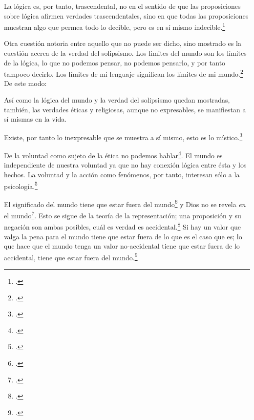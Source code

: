         La lógica es, por tanto, trascendental, no en el sentido de que las
        proposiciones sobre lógica afirmen verdades trascendentales, sino en que todas
        las proposiciones muestran algo que permea todo lo decible, pero es en sí mismo
        indecible.\footcite[cf.~][p.~166 \S2]{IWT}

        Otra cuestión notoria entre aquello que no puede ser dicho, sino mostrado es la
        cuestión acerca de la verdad del solipsismo. Los limites del mundo son los
        límites de la lógica, lo que no podemos pensar, no podemos pensarlo, y por tanto
        tampoco decirlo. Los límites de mi lenguaje significan los límites de mi
        mundo.\footcite[cf~.][5.6~y~5.61]{tractatus} De este modo:

        Así como la lógica del mundo y la verdad del solipsismo quedan mostradas,
        también, las verdades éticas y religiosas, aunque no expresables, se manifiestan
        a sí mismas en la vida. 

        Existe, por tanto lo inexpresable que se muestra a sí mismo, esto es lo
        místico.\footcite[cf.~][6.522]{tractatus}

        De la voluntad como sujeto de la ética no podemos
        hablar\footcite[cf.~][6.423]{tractatus}. El mundo es independiente de nuestra
        voluntad ya que no hay conexión lógica entre ésta y los hechos.
        La voluntad y la acción como fenómenos, por tanto, interesan sólo a la
        psicología.\footcite[cf.~][p.171 \S3]{IWT}

        El significado del mundo tiene que estar fuera del
        mundo\footcite[cf.~][6.41]{tractatus} y Dios no se revela \emph{en} el
        mundo\footcite[cf.~][6.432]{tractatus}. 
        Esto se sigue de la teoría de la representación; una proposición y su negación
        son ambas posibles, cuál es verdad es accidental.\footcite[cf.~][p.170 \S4]{IWT}
        Si hay un valor que valga la pena para el mundo tiene que estar fuera de lo que
        es el caso que es; lo que hace que el mundo tenga un valor no-accidental tiene
        que estar fuera de lo accidental, tiene que estar fuera del
        mundo.\footcite[cf.~][6.41]{tractatus} 


